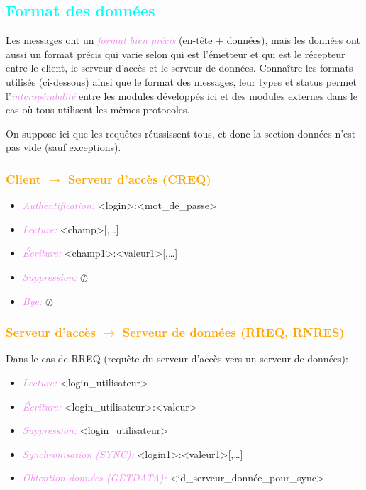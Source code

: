 \documentclass[a4paper]{article}
\newcommand{\ra}{\rightarrow}
\let\oldsubsection\subsection{}
\renewcommand{\subsection}[1]{\textcolor{cyan}{\oldsubsection{#1}}}
\let\oldsubsubsection\subsubsection{}
\renewcommand{\subsubsection}[1]{\textcolor{orange}{\oldsubsubsection{#1}}}
\let\oldtextit\textit
\renewcommand{\textit}[1]{\textcolor{violet}{\oldtextit{#1}}}
\begin{document}
\subsection{Format des données}

Les messages ont un \textit{format bien précis} (en-tête + données), mais les données ont aussi un format précis qui varie selon qui est l'émetteur et qui est le récepteur entre le client, le serveur d'accès et le serveur de données. Connaître les formats utilisés (ci-dessous) ainsi que le format des messages, leur types et status permet l'\textit{interopérabilité} entre les modules développés ici et des modules externes dans le cas où tous utilisent les mêmes protocoles.

On suppose ici que les requêtes réussissent tous, et donc la section données n'est pas vide (sauf exceptions).

\subsubsection{Client $\ra$ Serveur d'accès (CREQ)}

\begin{itemize}
    \item \textit{Authentification:} <login>:<mot\_de\_passe>
    \item \textit{Lecture:} <champ>[,\ldots]
    \item \textit{Écriture:} <champ1>:<valeur1>[,\ldots]
    \item \textit{Suppression:} $\oslash$
    \item \textit{Bye:} $\oslash$
\end{itemize}

\subsubsection{Serveur d'accès $\ra$ Serveur de données (RREQ, RNRES)}

Dans le cas de RREQ (requête du serveur d'accès vers un serveur de données):
\begin{itemize}
    \item \textit{Lecture:} <login\_utilisateur>
    \item \textit{Écriture:} <login\_utilisateur>:<valeur>
    \item \textit{Suppression:} <login\_utilisateur>
    \item \textit{Synchronisation (SYNC):} <login1>:<valeur1>[,\ldots]
    \item \textit{Obtention données (GETDATA):} <id\_serveur\_donnée\_pour\_sync>
\end{itemize}
\end{document}
